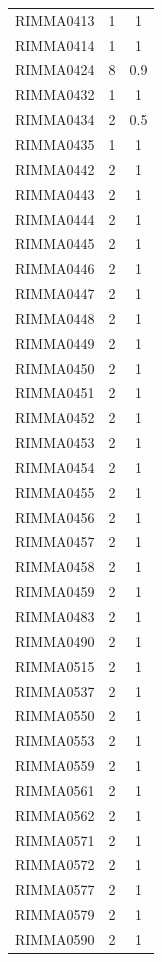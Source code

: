 \documentclass[12pt]{article}
\begin{document}
\begin{table}[htbp]
\begin{tabular}{ccc}
    RIMMA0413 & 1     & 1 \\
    RIMMA0414 & 1     & 1 \\
    RIMMA0424 & 8     & 0.9 \\
    RIMMA0432 & 1     & 1 \\
    RIMMA0434 & 2     & 0.5 \\
    RIMMA0435 & 1     & 1 \\
    RIMMA0442 & 2     & 1 \\
    RIMMA0443 & 2     & 1 \\
    RIMMA0444 & 2     & 1 \\
    RIMMA0445 & 2     & 1 \\
    RIMMA0446 & 2     & 1 \\
    RIMMA0447 & 2     & 1 \\
    RIMMA0448 & 2     & 1 \\
    RIMMA0449 & 2     & 1 \\
    RIMMA0450 & 2     & 1 \\
    RIMMA0451 & 2     & 1 \\
    RIMMA0452 & 2     & 1 \\
    RIMMA0453 & 2     & 1 \\
    RIMMA0454 & 2     & 1 \\
    RIMMA0455 & 2     & 1 \\
    RIMMA0456 & 2     & 1 \\
    RIMMA0457 & 2     & 1 \\
    RIMMA0458 & 2     & 1 \\
    RIMMA0459 & 2     & 1 \\
    RIMMA0483 & 2     & 1 \\
    RIMMA0490 & 2     & 1 \\
    RIMMA0515 & 2     & 1 \\
    RIMMA0537 & 2     & 1 \\
    RIMMA0550 & 2     & 1 \\
    RIMMA0553 & 2     & 1 \\
    RIMMA0559 & 2     & 1 \\
    RIMMA0561 & 2     & 1 \\
    RIMMA0562 & 2     & 1 \\
    RIMMA0571 & 2     & 1 \\
    RIMMA0572 & 2     & 1 \\
    RIMMA0577 & 2     & 1 \\
    RIMMA0579 & 2     & 1 \\
    RIMMA0590 & 2     & 1 \\

\end{tabular}
\end{table}
\end{document}
